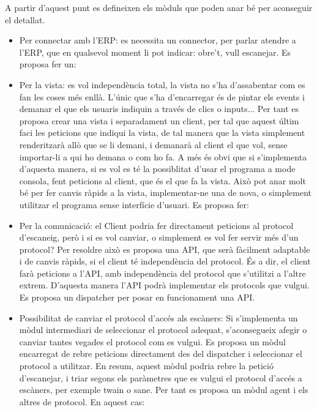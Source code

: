 \documentclass[letterpaper,11pt,catalan]{sphinxmanual}
\begin{document}
A partir d'aquest punt es defineixen els mòduls que poden anar bé per aconseguir el
detallat.
\begin{itemize}
\item {} 
Per connectar amb l'ERP:
es necessita un connector, per parlar atendre a l'ERP,
que en qualsevol moment li pot indicar: obre't, vull escanejar. Es proposa fer un:
\begin{quote}

\end{quote}

\item {} 
Per la vista:
es vol independència total, la vista no s'ha d'assabentar com es fan
les coses més enllà. L'únic que s'ha d'encarregar és de pintar els events i demanar
el que els usuaris indiquin a través de clics o inputs... Per tant es proposa crear
una vista i separadament un client, per tal que aquest últim faci les peticions
que indiqui la vista, de tal manera que la vista simplement renderitzarà allò que
se li demani, i demanarà al client el que vol, sense importar-li a qui ho demana o
com ho fa. A més és obvi que si s'implementa d'aquesta manera, si es vol es té la
possiblitat d'usar el programa a mode consola, fent peticions al client, que és
el que fa la vista. Això pot anar molt bé per fer canvis ràpids a la vista, implementar-ne
una de nova, o simplement utilitzar el programa sense interfície d'usuari. Es proposa fer:
\begin{quote}


\end{quote}

\item {} 
Per la comunicació:
el Client podria fer directament peticions al protocol d'escaneig,
però i si es vol canviar, o simplement es vol fer servir més d'un protocol? Per resoldre
això es proposa una API, que serà fàcilment adaptable i de canvis ràpids, si el client
té independència del protocol. És a dir, el client farà peticions a l'API, amb independència
del protocol que s'utilitzi a l'altre extrem. D'aquesta manera l'API podrà implementar els
protocols que vulgui. Es proposa un dispatcher per posar en funcionament una API.
\begin{quote}

\end{quote}

\item {} 
Possibilitat de canviar el protocol d'accés als escàners:
Si s'implementa un mòdul intermediari de seleccionar el protocol adequat, s'aconsegueix
afegir o canviar tantes vegades el protocol com es vulgui. Es proposa un mòdul encarregat
de rebre peticions directament des del dispatcher i seleccionar el protocol a utilitzar. En
resum, aquest mòdul podria rebre la petició d'escanejar, i triar segons els paràmetres
que es vulgui el protocol d'accés a escàners, per exemple twain o sane. Per tant es proposa
un mòdul agent i els altres de protocol. En aquest cas:
\begin{quote}


\end{quote}
\end{itemize}
\end{document}
